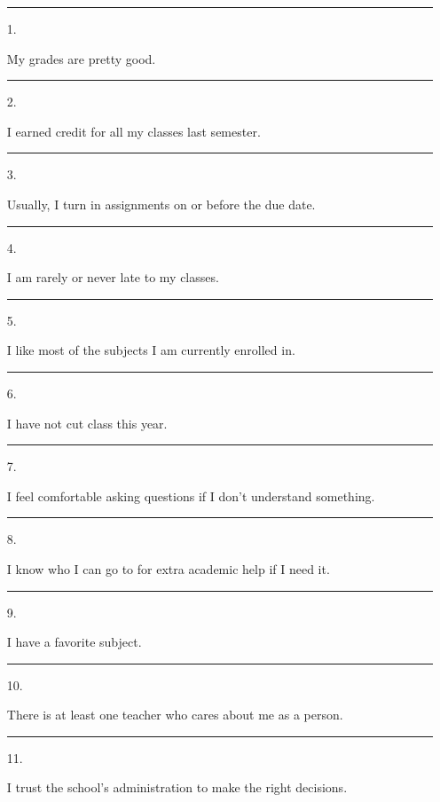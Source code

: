 \documentclass[letterpaper, 12pt]{article}
\begin{document}
\begin{enumerate}
	\item [\rule{0.4in}{0.01in} 1.] My grades are pretty good.
    \item [\rule{0.4in}{0.01in} 2.] I earned credit for all my classes last semester. 
    \item [\rule{0.4in}{0.01in} 3.] Usually, I turn in assignments on or before the due date.  
    \item [\rule{0.4in}{0.01in} 4.] I am rarely or never late to my classes.
    
    \item [\rule{0.4in}{0.01in} 5.]I like most of the subjects I am currently enrolled in. 
    \item [\rule{0.4in}{0.01in} 6.]I have not cut class this year. 
    \item [\rule{0.4in}{0.01in} 7.]I feel comfortable asking questions if I don't understand something. 
    \item [\rule{0.4in}{0.01in} 8.]I know who I can go to for extra academic help if I need it.
    \item [\rule{0.4in}{0.01in} 9.] I have a favorite subject.
    \item [\rule{0.3in}{0.01in} 10.]There is at least one teacher who cares about me as a person. 
    \item [\rule{0.3in}{0.01in} 11.]I trust the school's administration to make the right decisions. 
    \vspace{-.15in}

\end{enumerate}
\end{document}
